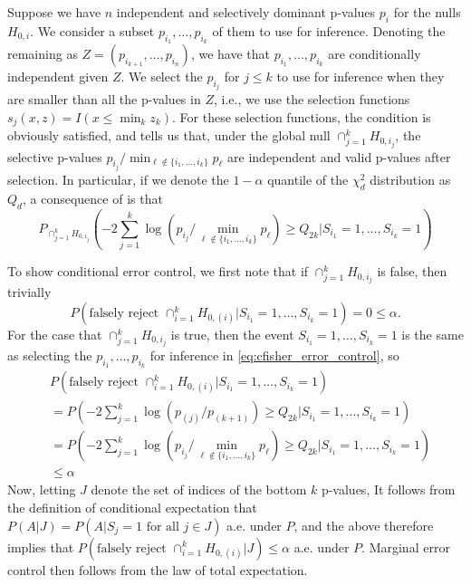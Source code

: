 \documentclass{article}
\begin{document}
\begin{appendix}
Suppose we have $n$ independent and selectively dominant p-values $p_i$ for the nulls $H_{0, i}$. We consider a subset $p_{i_1}, \dots, p_{i_k}$ of them to use for inference. Denoting the remaining as $Z = (p_{i_{k+1}}, \dots, p_{i_n})$, we have that $p_{i_1}, \dots, p_{i_k}$ are conditionally independent given $Z$. We select the $p_{i_j}$ for $j \leq k$ to use for inference when they are smaller than all the p-values in $Z$, i.e., we use the selection functions $s_{j}(x, z) = I(x \leq \min_k z_k)$. For these selection functions, the condition  is obviously satisfied, and  tells us that, under the global null $\cap_{j=1}^k H_{0, i_j} $, the selective p-values $p_{i_j}/\min_{\ell \not \in \{i_1, \dots, i_k \} } p_{\ell}$ are independent and valid p-values after selection. In particular, if we denote the $1-\alpha$ quantile of the $\chi^2_{d}$ distribution as $Q_d$, a consequence of  is that 
\begin{equation}
    \label{eq:cfisher_error_control}
    P_{\cap_{j=1}^k H_{0, i_j} }(-2 \sum_{j=1}^k \log(p_{i_j}/ \min_{\ell \not \in \{i_1, \dots, i_k\}} p_{\ell} ) \geq Q_{2k}|S_{i_1} = 1, \dots,  S_{i_k} = 1)
\end{equation}

To show conditional error control, we first note that if $ \cap_{j = 1}^k H_{0, i_j}$ is false, then trivially
\begin{equation*}
    P(\text{falsely reject } \cap_{i=1}^k H_{0, (i)} |S_{i_1} = 1, \dots,  S_{i_k} = 1) = 0 \leq \alpha.
\end{equation*} 
For the case that $\cap_{j = 1}^k H_{0, i_j}$ is true, then the event $S_{i_1} = 1, \dots,  S_{i_k} = 1$ is the same as selecting the $p_{i_1}, \dots, p_{i_k}$ for inference in \eqref{eq:cfisher_error_control}, so 
\begin{align*}
    &P(\text{falsely reject } \cap_{i=1}^k H_{0, (i)} |S_{i_1} = 1, \dots,  S_{i_k} = 1)\\
    &=P(-2 \sum_{j=1}^k \log(p_{(j)}/p_{(k+1)}) \geq Q_{2k} |S_{i_1} = 1, \dots,  S_{i_k} = 1)\\
    &=  P(-2 \sum_{j=1}^k \log(p_{i_j}/ \min_{\ell \not \in \{i_1, \dots, i_k\}} p_{\ell} ) \geq Q_{2k}|S_{i_1} = 1, \dots,  S_{i_k} = 1)\\
    &\leq \alpha 
\end{align*}
Now, letting $J$ denote the set of indices of the bottom $k$ p-values, It follows from the definition of conditional expectation that $P(A| J) = P(A | S_j = 1 \text{ for all } j \in J)$ a.e. under $P$, and the above therefore implies that $P(\text{falsely reject } \cap_{i=1}^k H_{0, (i)} | J)  \leq \alpha$ a.e. under $P$. Marginal error control then follows from the law of total expectation.


\end{appendix}
\end{document}
